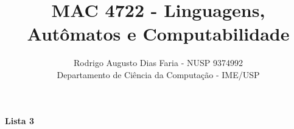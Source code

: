 \documentclass[12pt]{article}
\begin{document}
\title{MAC 4722 - Linguagens, Autômatos e Computabilidade}
\author{Rodrigo Augusto Dias Faria - NUSP 9374992\\
Departamento de Ciência da Computação - IME/USP}

\maketitle

%
%
%

%
%
%
%

\begin{center}
\textbf{\large{Lista 3}}
\end{center}





\printbibliography
\end{document}
